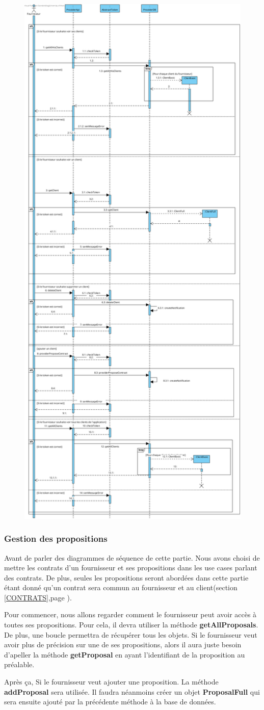 \newpage
\begin{figure}[h]
    \centering
    \includegraphics[height = 1\textwidth]{Base/sequence/img/fournisseur/voir_ses_clients.png}
\end{figure}
\newpage
\subsubsection{Gestion des propositions}
\begin{flushleft}
Avant de parler des diagrammes de séquence de cette partie. Nous avons choisi de mettre les contrats d'un fournisseur et ses propositions dans les use cases parlant des contrats. De plus, seules les propositions seront abordées dans cette partie étant donné qu'un contrat sera commun au fournisseur et au client(section \ref{CONTRATS},page \pageref{CONTRATS}).
\end{flushleft}

\begin{flushleft}
Pour commencer, nous allons regarder comment le fournisseur peut avoir accès à toutes ses propositions. Pour cela, il devra utiliser la méthode \textbf{getAllProposals}. De plus, une boucle permettra de récupérer tous les objets. Si le fournisseur veut avoir plus de précision sur une de ses propositions, alors il aura juste besoin d'apeller la méthode \textbf{getProposal} en ayant l'identifiant de la proposition au préalable.
\end{flushleft}
\begin{flushleft}
Après ça, Si le fournisseur veut ajouter une proposition. La méthode \textbf{addProposal} sera utilisée. Il faudra néanmoins créer un objet \textbf{ProposalFull} qui sera ensuite ajouté par la précédente méthode à la base de données. 
\end{flushleft}

